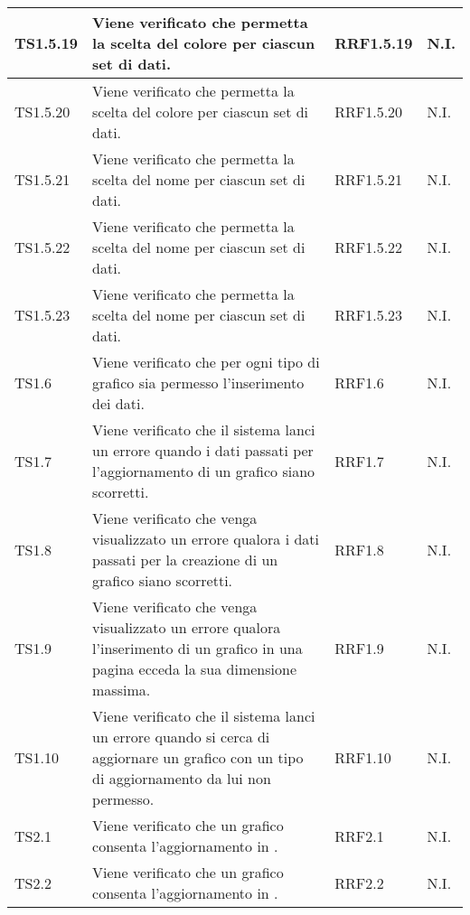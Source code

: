 \begin{longtabu}{| X[0.5] | X | X[0.5] | X[0.4] |}
TS1.5.19 & Viene verificato che  permetta la scelta del colore per ciascun set di dati. & RRF1.5.19 & N.I.\\ \hline

TS1.5.20 & Viene verificato che  permetta la scelta del colore per ciascun set di dati. & RRF1.5.20 & N.I.\\ \hline

TS1.5.21 &	Viene verificato che  permetta la scelta del nome per ciascun set di dati. & RRF1.5.21 & N.I.\\ \hline

TS1.5.22 &	Viene verificato che  permetta la scelta del nome per ciascun set di dati. & RRF1.5.22 & N.I.\\ \hline

TS1.5.23 &	Viene verificato che  permetta la scelta del nome per ciascun set di dati. & RRF1.5.23 & N.I.\\ \hline

TS1.6 & Viene verificato che per ogni tipo di grafico sia permesso l'inserimento dei dati. & RRF1.6 & N.I.\\ \hline

TS1.7 & Viene verificato che il sistema lanci un errore quando i dati passati per l'aggiornamento di un grafico siano scorretti. & RRF1.7 & N.I.\\ \hline

TS1.8 & Viene verificato che venga visualizzato un errore qualora i dati passati per la creazione di un grafico siano scorretti. & RRF1.8 & N.I.\\ \hline

TS1.9 & Viene verificato che venga visualizzato un errore qualora l'inserimento di un grafico in una pagina ecceda la sua dimensione massima. & RRF1.9 & N.I.\\ \hline

TS1.10 & Viene verificato che il sistema lanci un errore quando si cerca di aggiornare un grafico con un tipo di aggiornamento da lui non permesso. & RRF1.10 & N.I.\\ \hline

TS2.1 & Viene verificato che un grafico  consenta l'aggiornamento in . & RRF2.1 & N.I.\\ \hline

TS2.2 & Viene verificato che un grafico  consenta l'aggiornamento in . & RRF2.2 & N.I.\\ \hline


\end{longtabu}
